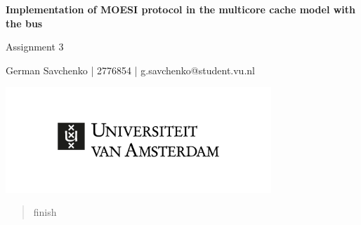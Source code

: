 \documentclass[sigconf]{acmart}
\begin{document}
\begin{titlepage}
   \begin{center}
       \vspace*{1cm}

       \LARGE
       \textbf{Implementation of MOESI protocol in the multicore cache model with the bus}
       \title{}

       \vspace{0.5cm}
       Assignment 3
            
       \vspace{2.5cm}

       German Savchenko | 2776854 | g.savchenko@student.vu.nl \\
       
       \vspace{2.0cm}   
            
       \vspace{2.0cm}
       
       \vspace{2.0cm}
       
       \includegraphics[width=10cm]{Figures/BWL-Logos_uva.png}

   \end{center}
\end{titlepage}


\begin{abstract}

\TODO finish
\end{abstract}

\maketitle
\pagestyle{plain}




\end{document}

